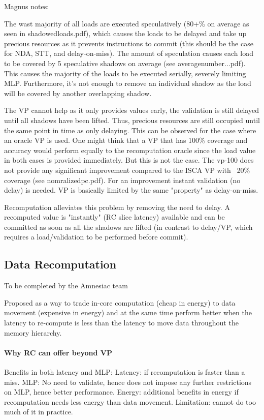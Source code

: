 {\color{blue} Magnus notes:

The wast majority of all loads are executed speculatively (80+\% on average as seen in shadowedloads.pdf), which causes the loads to be delayed and take up precious resources as it prevents instructions to commit (this should be the case for NDA, STT, and delay-on-miss).
The amount of speculation causes each load to be covered by 5 speculative shadows on average (see averagenumber...pdf). This causes the majority of the loads to be executed serially, severely limiting MLP. Furthermore, it's not enough to remove an individual shadow as the load will be covered by another overlapping shadow.

The VP cannot help as it only provides values early, the validation is still delayed until all shadows have been lifted. Thus, precious resources are still occupied until the same point in time as only delaying.
This can be observed for the case where an oracle VP is used. One might think that a VP that has 100\% coverage and accuracy would perform equally to the recomputation oracle since the load value in both cases is provided immediately. But this is not the case. The vp-100 does not provide any significant improvement compared to the ISCA VP with ~20\% coverage (see nomralizedpc.pdf). For an improvement instant validation (no delay) is needed. VP is basically limited by the same "property" as delay-on-miss.

Recomputation alleviates this problem by removing the need to delay. A recomputed value is "instantly" (RC slice latency) available and can be committed as soon as all the shadows are lifted (in contrast to delay/VP, which requires a load/validation to be performed before commit).

}

\subsection{Data Recomputation}
\label{sec:recmp}

{\color{red} To be completed by the Amnesiac team}

{\color{blue} Proposed as a way to trade in-core computation (cheap in energy) to data movement (expensive in energy) and at the same time perform better when the latency to re-compute is less than the latency to move data throughout the memory hierarchy.
\paragraph{Why RC can offer beyond VP}
Benefits in both latency and MLP: Latency: if recomputation is faster than a miss. MLP: No need to validate, hence does not impose any further restrictions on MLP, hence better performance. Energy: additional benefits in energy if recomputation needs less energy than data movement. Limitation: cannot do too much of it in practice. }



 
